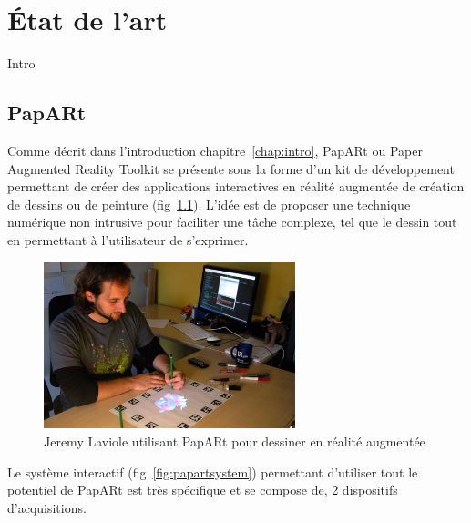 \chapter{État de l'art}

Intro

\section{PapARt}
\label{sec:papart}
Comme décrit dans l'introduction chapitre~\ref{chap:intro}, PapARt ou Paper Augmented Reality Toolkit se présente sous la forme d'un kit de développement permettant de créer des applications interactives en réalité augmentée de création de dessins ou de peinture (fig~\ref{fig:papartdemo}). L'idée est de proposer une technique numérique non intrusive pour faciliter une tâche complexe, tel que le dessin tout en permettant à l'utilisateur de s'exprimer. %

\begin{figure}[H]
\centering
\includegraphics[width=0.65\textwidth]{images/papart-demo}
\caption{Jeremy Laviole utilisant PapARt pour dessiner en réalité augmentée\protect\footnotemark}
\label{fig:papartdemo}
\end{figure}

Le système interactif (fig~\ref{fig:papartsystem}) permettant d'utiliser tout le potentiel de PapARt est très spécifique et se compose de, 2 dispositifs d'acquisitions.


